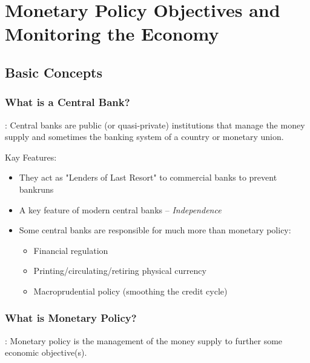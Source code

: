 \chapter{Monetary Policy Objectives and Monitoring the Economy}


\section{Basic Concepts}

    \subsection{What is a Central Bank?}
    
        : Central banks are public (or quasi-private) institutions that manage the money supply and sometimes the banking system of a country or monetary union.

        Kay Features:
        \begin{itemize}
            \item They act as "Lenders of Last Resort" to commercial banks to prevent bankruns
            \item A key feature of modern central banks -- \emph{Independence}
            \item Some central banks are responsible for much more than monetary policy:
            \begin{itemize}
                \item Financial regulation
                \item Printing/circulating/retiring physical currency
                \item Macroprudential policy (smoothing the credit cycle)
            \end{itemize}
        \end{itemize}
        
    \subsection{What is Monetary Policy?}

        : Monetary policy is the management of the money supply to further some economic objective(s).

